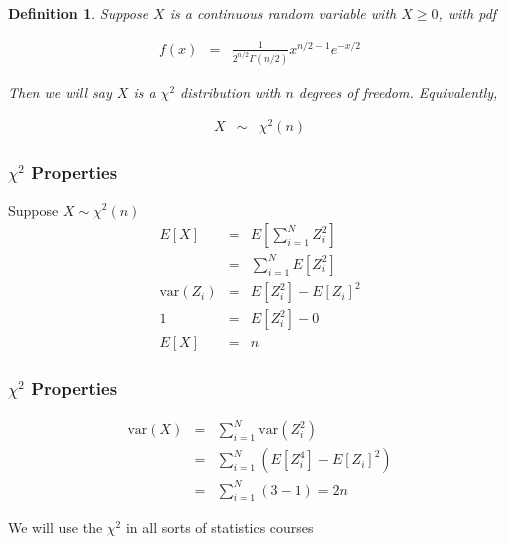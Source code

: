 \documentclass{beamer}
\newtheorem{defn}{Definition}
\numberwithin{equation}{section}
\begin{document}
\begin{frame}

\begin{defn}
Suppose $X$ is a continuous random variable with $X\geq 0$, with pdf 

\begin{eqnarray}
f(x) & = & \frac{1}{2^{n/2} \Gamma(n/2) } x^{n/2 - 1} e^{-x/2} \nonumber 
\end{eqnarray}

Then we will say $X$ is a $\chi^2$ distribution with $n$ degrees of freedom.  Equivalently,

\begin{eqnarray}
X & \sim & \chi^{2}(n) \nonumber 
\end{eqnarray}

\end{defn}



\end{frame}


\begin{frame}
\frametitle{$\chi^2$ Properties}

Suppose $X \sim \chi^2(n)$
\begin{eqnarray}
E[X] & = & E\left[\sum_{i=1}^{N} Z_{i}^2\right] \nonumber \\
 & = & \sum_{i=1}^{N} E[Z_{i}^{2} ] \nonumber \\
\text{var}(Z_{i} ) & = & E[Z_{i}^2] - E[Z_{i}]^2 \nonumber\\
1 & = & E[Z_{i}^2]- 0 \nonumber \\
E[X] & = & n \nonumber 
 \end{eqnarray}



\end{frame}

\begin{frame}
\frametitle{$\chi^2$ Properties}

\begin{eqnarray}
\text{var}(X) & = & \sum_{i=1}^{N} \text{var}(Z_{i}^2) \nonumber \\
& = & \sum_{i=1}^{N} \left(E[Z_{i}^{4} ] - E[Z_{i}]^{2}  \right) \nonumber \\
& = & \sum_{i=1}^{N} \left(3 - 1\right ) = 2n \nonumber 
\end{eqnarray}

We will use the $\chi^2$ in all sorts of statistics courses  


\end{frame}
\end{document}
